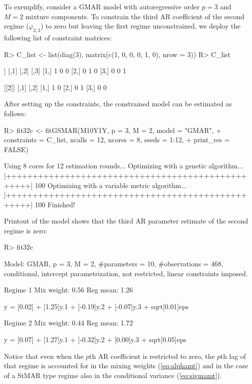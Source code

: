 \documentclass[nojss]{jss} %
\begin{document}
To exemplify, consider a GMAR model with autoregressive order $p=3$ and $M=2$ mixture components. To constrain the third AR coefficient of the second regime ($\varphi_{2,3}$) to zero but leaving the first regime unconstrained, we deploy the following list of constraint matrices:
%
\begin{CodeChunk}
\begin{CodeInput}
R> C_list <- list(diag(3), matrix(c(1, 0, 0, 0, 1, 0), nrow = 3))
R> C_list
\end{CodeInput}
\begin{CodeOutput}
[[1]]
     [,1] [,2] [,3]
[1,]    1    0    0
[2,]    0    1    0
[3,]    0    0    1

[[2]]
     [,1] [,2]
[1,]    1    0
[2,]    0    1
[3,]    0    0
\end{CodeOutput}
\end{CodeChunk}
%
After setting up the constraints, the constrained model can be estimated as follows:
%
\begin{CodeChunk}
\begin{CodeInput}
R> fit32c <- fitGSMAR(M10Y1Y, p = 3, M = 2, model = "GMAR",
+    constraints = C_list, ncalls = 12, ncores = 8, seeds = 1:12,
+    print_res = FALSE)
\end{CodeInput}
\begin{CodeOutput}
Using 8 cores for 12 estimation rounds...
Optimizing with a genetic algorithm...
  |++++++++++++++++++++++++++++++++++++++++++++++++++| 100%
Optimizing with a variable metric algorithm...
  |++++++++++++++++++++++++++++++++++++++++++++++++++| 100%
Finished!
\end{CodeOutput}
\end{CodeChunk}
%
Printout of the model shows that the third AR parameter estimate of the second regime is zero:
%
\begin{CodeChunk}
\begin{CodeInput}
R> fit32c
\end{CodeInput}
\begin{CodeOutput}
Model:
 GMAR, p = 3, M = 2, #parameters = 10, #observations = 468,
 conditional, intercept parametrization, not restricted, linear constraints
 imposed.

Regime 1
Mix weight: 0.56
Reg mean: 1.26

y = [0.02] + [1.25]y.1 + [-0.19]y.2 + [-0.07]y.3 + sqrt[0.01]eps

Regime 2
Mix weight: 0.44
Reg mean: 1.72

y = [0.07] + [1.27]y.1 + [-0.32]y.2 + [0.00]y.3 + sqrt[0.05]eps
\end{CodeOutput}
\end{CodeChunk}
%
Notice that even when the $p$th AR coefficient is restricted to zero, the $p$th lag of that regime is accounted for in the mixing weights (\ref{eq:alphamt}) and in the case of a StMAR type regime also in the conditional variance (\ref{eq:sigmamt}).
\end{document}
